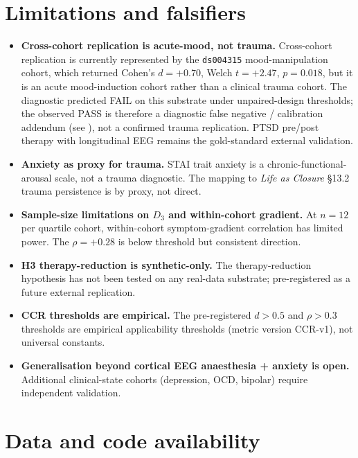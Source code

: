 \documentclass[11pt,a4paper]{article}
\begin{document}
\section{Limitations and falsifiers}\label{sec:limits}

\begin{itemize}\itemsep0pt
\item \textbf{Cross-cohort replication is acute-mood, not trauma.} Cross-cohort replication is currently represented by the \texttt{ds004315} mood-manipulation cohort, which returned Cohen's $d = +0.70$, Welch $t = +2.47$, $p = 0.018$, but it is an acute mood-induction cohort rather than a clinical trauma cohort. The diagnostic predicted FAIL on this substrate under unpaired-design thresholds; the observed PASS is therefore a diagnostic false negative / calibration addendum (see \citet{SmartClosureDistance}), not a confirmed trauma replication. PTSD pre/post therapy with longitudinal EEG remains the gold-standard external validation.
\item \textbf{Anxiety as proxy for trauma.} STAI trait anxiety is a chronic-functional-arousal scale, not a trauma diagnostic. The mapping to \emph{Life as Closure} \S 13.2 trauma persistence is by proxy, not direct.
\item \textbf{Sample-size limitations on $D_3$ and within-cohort gradient.} At $n = 12$ per quartile cohort, within-cohort symptom-gradient correlation has limited power. The $\rho = +0.28$ is below threshold but consistent direction.
\item \textbf{H3 therapy-reduction is synthetic-only.} The therapy-reduction hypothesis has not been tested on any real-data substrate; pre-registered as a future external replication.
\item \textbf{CCR thresholds are empirical.} The pre-registered $d > 0.5$ and $\rho > 0.3$ thresholds are empirical applicability thresholds (metric version CCR-v1), not universal constants.
\item \textbf{Generalisation beyond cortical EEG anaesthesia + anxiety is open.} Additional clinical-state cohorts (depression, OCD, bipolar) require independent validation.
\end{itemize}

\section{Data and code availability}\label{sec:data}
\end{document}
